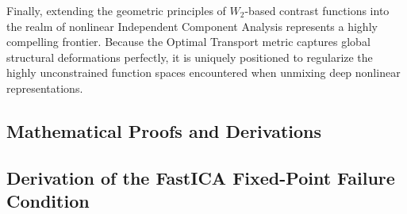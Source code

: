 \documentclass[12pt,a4paper,twoside,openany]{book}
\begin{document}
Finally, extending the geometric principles of $W_2$-based contrast functions into the realm of nonlinear Independent Component Analysis represents 
a highly compelling frontier. Because the Optimal Transport metric captures global structural deformations perfectly, it is uniquely positioned to regularize 
the highly unconstrained function spaces encountered when unmixing deep nonlinear representations.

\backmatter


 

\begin{appendices}
    \chapter{Mathematical Proofs and Derivations}
    
    \section{Derivation of the FastICA Fixed-Point Failure Condition}
    \label{app:fastica_proof}
    

\end{appendices}
\end{document}
